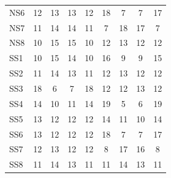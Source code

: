 \begin{table}[ht]
\begin{tabular}{lcccccccc}
NS6 & 12 & 13 & 13 & 12 & 18 & 7 & 7 & 17 \\
NS7 & 11 & 14 & 14 & 11 & 7 & 18 & 17 & 7 \\
NS8 & 10 & 15 & 15 & 10 & 12 & 13 & 12 & 12 \\
\midrule
SS1 & 10 & 15 & 14 & 10 & 16 & 9 & 9 & 15 \\
SS2 & 11 & 14 & 13 & 11 & 12 & 13 & 12 & 12 \\
SS3 & 18 & 6 & 7 & 18 & 12 & 12 & 13 & 12 \\
SS4 & 14 & 10 & 11 & 14 & 19 & 5 & 6 & 19 \\
SS5 & 13 & 12 & 12 & 12 & 14 & 11 & 10 & 14 \\
SS6 & 13 & 12 & 12 & 12 & 18 & 7 & 7 & 17 \\
SS7 & 12 & 13 & 12 & 12 & 8 & 17 & 16 & 8 \\
SS8 & 11 & 14 & 13 & 11 & 11 & 14 & 13 & 11 \\
\bottomrule
\end{tabular}
\end{table}